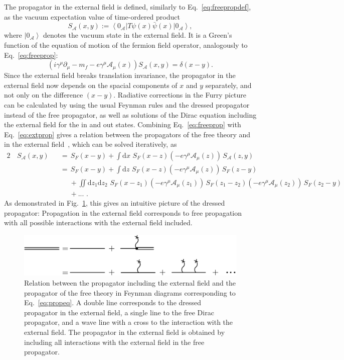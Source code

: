 The propagator in the external field is defined, similarly to Eq.~\eqref{eq:freepropdef}, as the vacuum expectation value of time-ordered product
\begin{equation}
S_{\mathcal{A}}(x,y):=\left<0_\mathcal{A}\right|T\psi(x)\bar{\psi}(x) \left|0_\mathcal{A}\right>,
\label{eq:extpropdef}
\end{equation}
where $\left|0_\mathcal{A}\right>$ denotes the vacuum state in the external field.
It is a Green's function of the equation of motion of the fermion field operator, analogously to Eq.~\eqref{eq:freeprop}:
\begin{equation}
\left(i\gamma^\mu \partial_\mu -m_f - e \gamma^\mu \mathcal{A}_\mu(x)\right)S_{\mathcal{A}}(x,y)=\delta(x-y).
\label{eq:extprop}
\end{equation}
Since the external field breaks translation invariance, the propagator in the external field now depends on the spacial components of $x$ and $y$ separately, and not only on the difference $(x-y)$. Radiative corrections in the Furry picture can be calculated by using the usual Feynman rules and the dressed propagator instead of the free propagator, as well as solutions of the Dirac equation including the external field for the in and out states. Combining Eq.~\eqref{eq:freeprop} with Eq.~\eqref{eq:extprop} gives a relation between the propagators of the free theory and in the external field~\mbox{\cite[Section 2.5.]{itzykson2005}}, which can be solved iteratively, as
\begin{alignat}{2}
&\,S_{\mathcal{A}}(x,y)&&= \,S_F(x-y) 
+ \int\mathrm{d}x\, \,S_F(x-z)\left(-e\gamma^\mu \mathcal{A}_\mu(z)\right)\,S_{\mathcal{A}}(z,y)\\
& &&=\,S_F(x-y)+\int\mathrm{d}z\,\,S_F(x-z)(-e\gamma^\mu \mathcal{A}_\mu(z))\,S_F(z-y)\\
&&&\phantom{=}+\iint\mathrm{d}z_1\mathrm{d}z_2\,\,S_F(x-z_1)(-e\gamma^\mu \mathcal{A}_\mu(z_1))\,S_F(z_1-z_2)(-e\gamma^\mu \mathcal{A}_\mu(z_2))\,S_F(z_2-y)\\
&&&\phantom{=}+...\,\,.\label{eq:propeq}
\end{alignat}
As demonstrated in Fig.~\ref{fig:propagator}, this gives an intuitive picture of the dressed propagator: Propagation in the external field corresponds to free propagation with all possible interactions with the external field included.
%
\begin{figure}%
\centering
\includegraphics[width=0.9\linewidth]{pics/propagator.pdf}%
\caption{Relation between the propagator including the external field and the propagator of the free theory in Feynman diagrams corresponding to Eq.~\eqref{eq:propeq}. A double line corresponds to the dressed propagator in the external field, a single line to the free Dirac propagator, and a wave line with a cross to the interaction with the external field. The propagator in the external field is obtained by including all interactions with the external field in the free propagator.}%
\label{fig:propagator}%
\end{figure}
